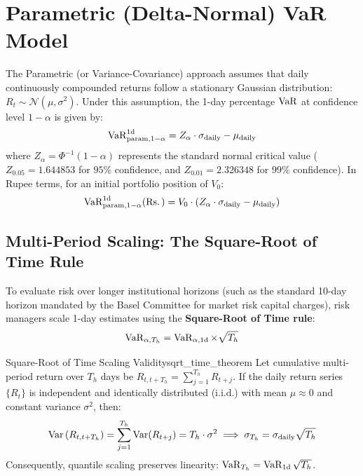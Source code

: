 \section{Parametric (Delta-Normal) VaR Model}
\label{sec:parametric_var}

The Parametric (or Variance-Covariance) approach assumes that daily continuously compounded returns follow a stationary Gaussian distribution: $R_t \sim \mathcal{N}(\mu, \sigma^2)$. Under this assumption, the 1-day percentage $\operatorname{VaR}$ at confidence level $1 - \alpha$ is given by:
\begin{equation}
\operatorname{VaR}_{\text{param}, 1-\alpha}^{1\text{d}} = Z_{\alpha} \cdot \sigma_{\text{daily}} - \mu_{\text{daily}}
\label{eq:parametric_1d}
\end{equation}
where $Z_{\alpha} = \Phi^{-1}(1 - \alpha)$ represents the standard normal critical value ($Z_{0.05} = 1.644853$ for $95\%$ confidence, and $Z_{0.01} = 2.326348$ for $99\%$ confidence). In Rupee terms, for an initial portfolio position of $V_0$:
\begin{equation}
\operatorname{VaR}_{\text{param}, 1-\alpha}^{1\text{d}} (\text{\text{Rs.}\,}) = V_0 \cdot \left( Z_{\alpha} \cdot \sigma_{\text{daily}} - \mu_{\text{daily}} \right)
\label{eq:parametric_1d_inr}
\end{equation}

\subsection{Multi-Period Scaling: The Square-Root of Time Rule}

To evaluate risk over longer institutional horizons (such as the standard 10-day horizon mandated by the Basel Committee for market risk capital charges), risk managers scale 1-day estimates using the \textbf{Square-Root of Time rule}:
\begin{equation}
\operatorname{VaR}_{\alpha, T_h} = \operatorname{VaR}_{\alpha, 1\text{d}} \times \sqrt{T_h}
\label{eq:sqrt_time}
\end{equation}

\begin{theorem}{Square-Root of Time Scaling Validity}{sqrt_time_theorem}
Let cumulative multi-period return over $T_h$ days be $R_{t, t+T_h} = \sum_{j=1}^{T_h} R_{t+j}$. If the daily return series $\{R_t\}$ is independent and identically distributed ($\text{i.i.d.}$) with mean $\mu \approx 0$ and constant variance $\sigma^2$, then:
\begin{equation}
\operatorname{Var}\left(R_{t, t+T_h}\right) = \sum_{j=1}^{T_h} \operatorname{Var}(R_{t+j}) = T_h \cdot \sigma^2 \implies \sigma_{T_h} = \sigma_{\text{daily}} \sqrt{T_h}
\end{equation}
Consequently, quantile scaling preserves linearity: $\operatorname{VaR}_{T_h} = \operatorname{VaR}_{1\text{d}} \sqrt{T_h}$.
\end{theorem}

